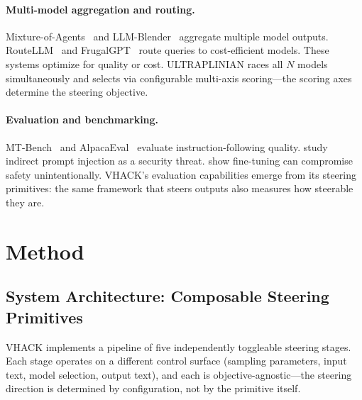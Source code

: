\documentclass[11pt]{article}
\begin{document}
\paragraph{Multi-model aggregation and routing.}
Mixture-of-Agents~\cite{wang2024mixture} and LLM-Blender~\cite{jiang2023llmblender} aggregate multiple model outputs. RouteLLM~\cite{ong2024routellm} and FrugalGPT~\cite{chen2023frugalgpt} route queries to cost-efficient models. These systems optimize for quality or cost. ULTRAPLINIAN races all $N$ models simultaneously and selects via configurable multi-axis scoring---the scoring axes determine the steering objective.

\paragraph{Evaluation and benchmarking.}
MT-Bench~\cite{zheng2024judging} and AlpacaEval~\cite{li2023alpacaeval} evaluate instruction-following quality. \citet{greshake2023not} study indirect prompt injection as a security threat. \citet{qi2024finetuning} show fine-tuning can compromise safety unintentionally. VHACK's evaluation capabilities emerge from its steering primitives: the same framework that steers outputs also measures how steerable they are.

\section{Method}
\label{sec:method}

\subsection{System Architecture: Composable Steering Primitives}

VHACK implements a pipeline of five independently toggleable steering stages. Each stage operates on a different control surface (sampling parameters, input text, model selection, output text), and each is objective-agnostic---the steering direction is determined by configuration, not by the primitive itself.
\end{document}
